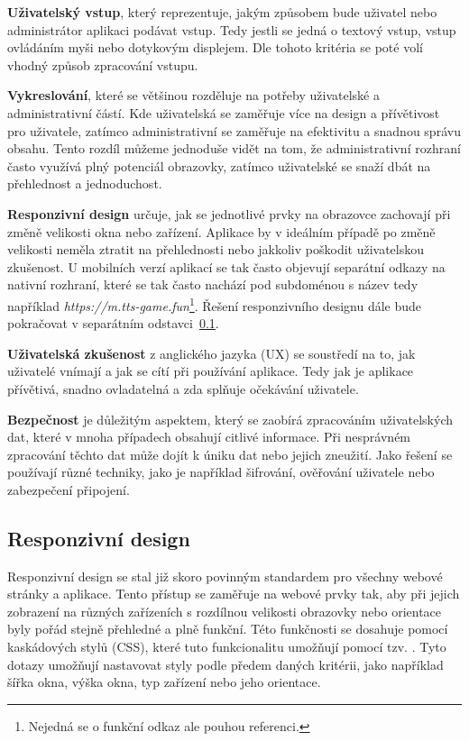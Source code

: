\begin{description}
    \item \textbf{Uživatelský vstup}, který reprezentuje, jakým způsobem bude uživatel nebo administrátor aplikaci podávat vstup. Tedy jestli se jedná o textový vstup, vstup ovládáním myši nebo dotykovým displejem. Dle tohoto kritéria se poté volí vhodný způsob zpracování vstupu.
    \item \textbf{Vykreslování}, které se většinou rozděluje na potřeby uživatelské a administrativní částí. Kde uživatelská se zaměřuje více na design a přívětivost pro uživatele, zatímco administrativní se zaměřuje na efektivitu a snadnou správu obsahu. Tento rozdíl můžeme jednoduše vidět na tom, že administrativní rozhraní často využívá plný potenciál obrazovky, zatímco uživatelské se snaží dbát na přehlednost a jednoduchost.
    \item \textbf{Responzivní design} určuje, jak se jednotlivé prvky na obrazovce zachovají při změně velikosti okna nebo zařízení. Aplikace by v ideálním případě po změně velikosti neměla ztratit na přehlednosti nebo jakkoliv poškodit uživatelskou zkušenost. U mobilních verzí aplikací se tak často objevují separátní odkazy na nativní rozhraní, které se tak často nachází pod subdoménou s název  tedy například \textit{https://m.tts-game.fun}\footnote{Nejedná se o funkční odkaz ale pouhou referenci.}. Řešení responzivního designu dále bude pokračovat v separátním odstavci~\ref{subsec:ui-gui-theory-responsive-design}.
    \item \textbf{Uživatelská zkušenost} z anglického jazyka \textit{} (UX) se soustředí na to, jak uživatelé vnímají a jak se cítí při používání aplikace. Tedy jak je aplikace přívětivá, snadno ovladatelná a zda splňuje očekávání uživatele.
    \item \textbf{Bezpečnost} je důležitým aspektem, který se zaobírá zpracováním uživatelských dat, které v mnoha případech obsahují citlivé informace. Při nesprávném zpracování těchto dat může dojít k úniku dat nebo jejich zneužití. Jako řešení se používají různé techniky, jako je například šifrování, ověřování uživatele nebo zabezpečení připojení.
\end{description}

\subsection{Responzivní design}
\label{subsec:ui-gui-theory-responsive-design}
Responzivní design se stal již skoro povinným standardem pro všechny webové stránky a aplikace. Tento přístup se zaměřuje na webové prvky tak, aby při jejich zobrazení na různých zařízeních s rozdílnou velikosti obrazovky nebo orientace byly pořád stejně přehledné a plně funkční. Této funkčnosti se dosahuje pomocí kaskádových stylů (CSS), které tuto funkcionalitu umožňují pomocí tzv. \textit{}. Tyto dotazy umožňují nastavovat styly podle předem daných kritérii, jako například šířka okna, výška okna, typ zařízení nebo jeho orientace.

